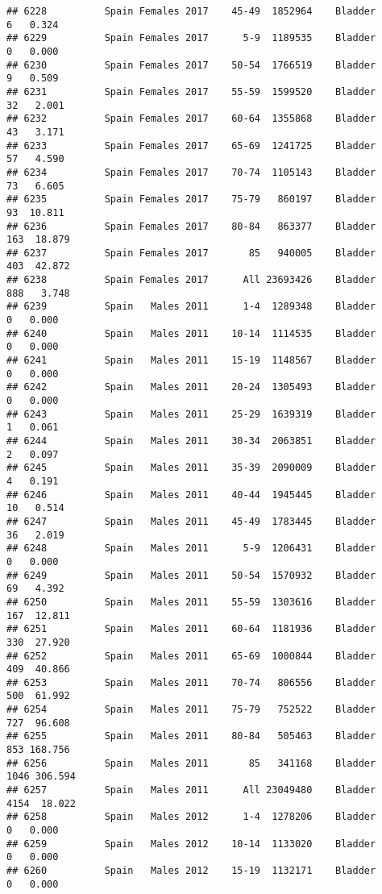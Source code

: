 \documentclass[
]{article}
\begin{document}
\begin{verbatim}
## 6228          Spain Females 2017    45-49  1852964    Bladder      6   0.324
## 6229          Spain Females 2017      5-9  1189535    Bladder      0   0.000
## 6230          Spain Females 2017    50-54  1766519    Bladder      9   0.509
## 6231          Spain Females 2017    55-59  1599520    Bladder     32   2.001
## 6232          Spain Females 2017    60-64  1355868    Bladder     43   3.171
## 6233          Spain Females 2017    65-69  1241725    Bladder     57   4.590
## 6234          Spain Females 2017    70-74  1105143    Bladder     73   6.605
## 6235          Spain Females 2017    75-79   860197    Bladder     93  10.811
## 6236          Spain Females 2017    80-84   863377    Bladder    163  18.879
## 6237          Spain Females 2017       85   940005    Bladder    403  42.872
## 6238          Spain Females 2017      All 23693426    Bladder    888   3.748
## 6239          Spain   Males 2011      1-4  1289348    Bladder      0   0.000
## 6240          Spain   Males 2011    10-14  1114535    Bladder      0   0.000
## 6241          Spain   Males 2011    15-19  1148567    Bladder      0   0.000
## 6242          Spain   Males 2011    20-24  1305493    Bladder      0   0.000
## 6243          Spain   Males 2011    25-29  1639319    Bladder      1   0.061
## 6244          Spain   Males 2011    30-34  2063851    Bladder      2   0.097
## 6245          Spain   Males 2011    35-39  2090009    Bladder      4   0.191
## 6246          Spain   Males 2011    40-44  1945445    Bladder     10   0.514
## 6247          Spain   Males 2011    45-49  1783445    Bladder     36   2.019
## 6248          Spain   Males 2011      5-9  1206431    Bladder      0   0.000
## 6249          Spain   Males 2011    50-54  1570932    Bladder     69   4.392
## 6250          Spain   Males 2011    55-59  1303616    Bladder    167  12.811
## 6251          Spain   Males 2011    60-64  1181936    Bladder    330  27.920
## 6252          Spain   Males 2011    65-69  1000844    Bladder    409  40.866
## 6253          Spain   Males 2011    70-74   806556    Bladder    500  61.992
## 6254          Spain   Males 2011    75-79   752522    Bladder    727  96.608
## 6255          Spain   Males 2011    80-84   505463    Bladder    853 168.756
## 6256          Spain   Males 2011       85   341168    Bladder   1046 306.594
## 6257          Spain   Males 2011      All 23049480    Bladder   4154  18.022
## 6258          Spain   Males 2012      1-4  1278206    Bladder      0   0.000
## 6259          Spain   Males 2012    10-14  1133020    Bladder      0   0.000
## 6260          Spain   Males 2012    15-19  1132171    Bladder      0   0.000

\end{verbatim}
\end{document}
